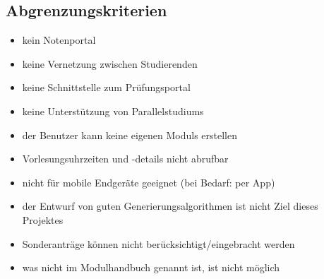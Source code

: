 \subsection{Abgrenzungskriterien}
\begin{itemize}[nosep]
	\item kein Notenportal
	\item keine Vernetzung zwischen Studierenden
	\item keine Schnittstelle zum Prüfungsportal
	\item keine Unterstützung von \glspl{Parallelstudium}
	\item der \gls{Benutzer} kann keine eigenen \glspl{Modul} erstellen
	\item Vorlesungsuhrzeiten und -details nicht abrufbar
	\item nicht für mobile Endgeräte geeignet (bei Bedarf: per App)
	\item der Entwurf von guten Generierungsalgorithmen ist nicht Ziel dieses Projektes
	\item Sonderanträge können nicht berücksichtigt/eingebracht werden
	\item was nicht im Modulhandbuch genannt ist, ist nicht möglich
\end{itemize}